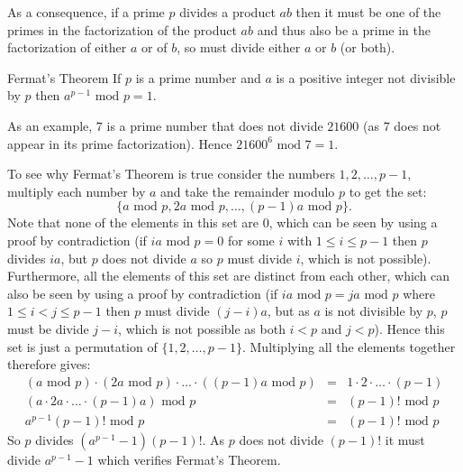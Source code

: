 As a consequence, if a prime $p$ divides a product $ab$ then it must be one of the primes
in the factorization of the product $ab$ and thus also be a prime in the factorization
of either $a$ or of $b$, so must divide either $a$ or $b$ (or both).

\begin{theorem}{Fermat's Theorem}
If $p$ is a prime number and $a$ is a positive integer not divisible by $p$ then
$a^{p-1} \mbox{ mod } p = 1$.
\end{theorem}

As an example, $7$ is a prime number that does not divide $21600$ (as $7$ does not
appear in its prime factorization). Hence $21600^6\mbox{ mod }7=1$.

To see why Fermat's Theorem is true consider the numbers $1, 2, \dots, p-1$, multiply
each number by $a$ and take the remainder modulo $p$ to get the set:
\begin{displaymath}
  \{a\mbox{ mod }p, 2a\mbox{ mod }p, \dots, (p-1)a\mbox{ mod }p\}.
\end{displaymath}
Note that none of the elements in this set are $0$, which can be
seen by using a proof by contradiction (if $ia\mbox{ mod }p=0$
for some $i$ with $1\leq i\leq p-1$ then $p$ divides $ia$, but $p$ does not
divide $a$ so $p$ must divide $i$, which is not possible).
Furthermore, all the elements of this set are distinct from each other,
which can also be seen by using a proof by contradiction
(if $ia\mbox{ mod }p = ja\mbox{ mod }p$  where
$1\leq i<j\leq p-1$ then $p$ must divide $(j-i)a$,
but as $a$ is not divisible by $p$, $p$ must be divide $j-i$,
which is not possible as both $i<p$ and $j<p$).
Hence this set is just a permutation of $\{1, 2, \dots, p-1\}$.
Multiplying all the elements together therefore gives:
\begin{eqnarray*}
  (a\mbox{ mod }p)\cdot(2a\mbox{ mod }p)\cdot\dots\cdot((p-1)a\mbox{ mod }p)
    &=& 1\cdot2\cdot\dots\cdot(p-1) \\
  (a\cdot2a\cdot\dots\cdot(p-1)a)\mbox{ mod }p
    &=& (p-1)!\mbox{ mod }p \\
  a^{p-1} (p-1)!\mbox{ mod }p &=& (p-1)!\mbox{ mod }p
\end{eqnarray*}
So $p$ divides $(a^{p-1}-1)(p-1)!$. As $p$ does not divide $(p-1)!$ it must divide
$a^{p-1}-1$ which verifies Fermat's Theorem.

